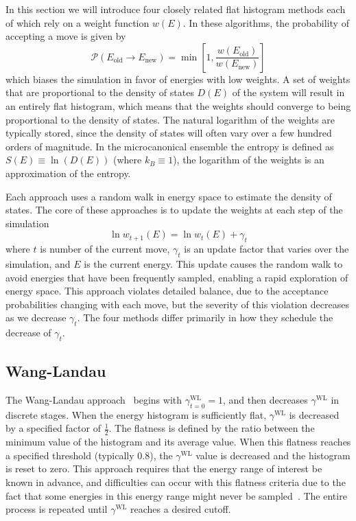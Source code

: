 \documentclass[letterpaper,twocolumn,amsmath,amssymb,pre,aps,10pt]{revtex4-1}
\begin{document}
In this section we will introduce four closely related flat histogram
methods each of which rely on a weight function $w(E)$.  In these
algorithms, the probability of accepting a move is given by
\begin{equation}
	\mathcal{P}(E_\text{old} \rightarrow E_\text{new})
	= \min\left[1,\frac{w(E_\text{old})}{w(E_\text{new})}\right]
\end{equation}
which biases the simulation in favor of energies with low weights.  A set of
weights that are proportional to the density of states $D(E)$ of the system will
result in an entirely flat histogram, which means that the weights should
converge to being proportional to the density of states.  The natural logarithm
of the weights are typically stored, since the density of states will often vary
over a few hundred orders of magnitude. In the microcanonical ensemble the
entropy is defined as $S(E) \equiv \ln(D(E))$ (where $k_B \equiv 1$), the
logarithm of the weights is an approximation of the entropy.

Each approach uses a random walk in energy space to estimate the density of
states.  The core of these approaches is to update the weights at each step of
the simulation
\begin{equation}
	\ln{w_{t+1}(E)}=\ln{w_{t}(E)}
	+\gamma_t
\end{equation}
where $t$ is number of the current move, $\gamma_t$ is an update factor
that varies over the simulation, and $E$ is the current energy.  This update
causes the random walk to avoid energies that have been frequently sampled,
enabling a rapid exploration of energy space. This approach violates detailed
balance, due to the acceptance probabilities changing with each move, but the
severity of this violation decreases as we decrease $\gamma_t$.  The four
methods differ primarily in how they schedule the decrease of $\gamma_t$.

\subsection{Wang-Landau}

The Wang-Landau approach~\cite{wang2001efficient,wang2001determining,
landau2014guide} begins with $\gamma^{\text{WL}}_{t=0}=1$, and then decreases
$\gamma^{\text{WL}}$ in discrete stages.  When the energy histogram is
sufficiently flat, $\gamma^{\text{WL}}$ is decreased by a specified factor of
$\frac12$.  The flatness is defined by the ratio between the minimum value of
the histogram and its average value.  When this flatness reaches a specified
threshold (typically 0.8), the $\gamma^{\text{WL}}$ value is decreased and the
histogram is reset to zero.  This approach requires that the energy range of
interest be known in advance, and difficulties can occur with this flatness
criteria due to the fact that some energies in this energy range might never be
sampled~\cite{troster2005wang}.  The entire process is repeated until
$\gamma^{\text{WL}}$ reaches a desired cutoff.
\end{document}
